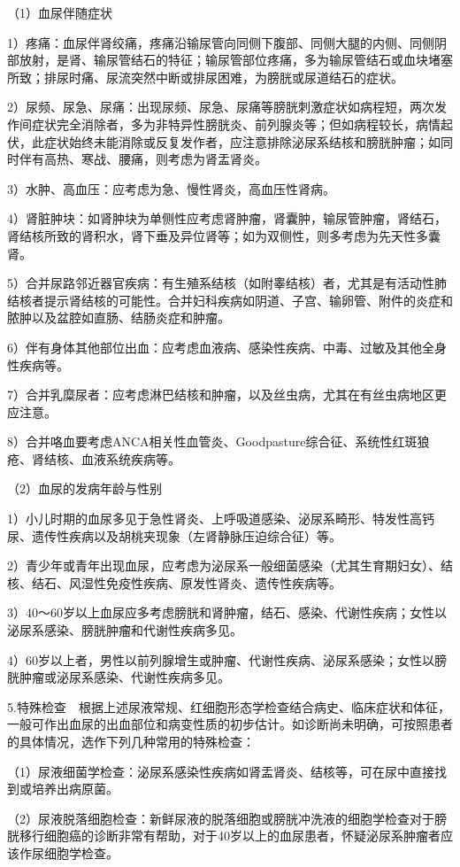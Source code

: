 （1）血尿伴随症状

1）疼痛：血尿伴肾绞痛，疼痛沿输尿管向同侧下腹部、同侧大腿的内侧、同侧阴部放射，是肾、输尿管结石的特征；输尿管部位疼痛，多为输尿管结石或血块堵塞所致；排尿时痛、尿流突然中断或排尿困难，为膀胱或尿道结石的症状。

2）尿频、尿急、尿痛：出现尿频、尿急、尿痛等膀胱刺激症状如病程短，两次发作间症状完全消除者，多为非特异性膀胱炎、前列腺炎等；但如病程较长，病情起伏，此症状始终未能消除或反复发作者，应注意排除泌尿系结核和膀胱肿瘤；如同时伴有高热、寒战、腰痛，则考虑为肾盂肾炎。

3）水肿、高血压：应考虑为急、慢性肾炎，高血压性肾病。

4）肾脏肿块：如肾肿块为单侧性应考虑肾肿瘤，肾囊肿，输尿管肿瘤，肾结石，肾结核所致的肾积水，肾下垂及异位肾等；如为双侧性，则多考虑为先天性多囊肾。

5）合并尿路邻近器官疾病：有生殖系结核（如附睾结核）者，尤其是有活动性肺结核者提示肾结核的可能性。合并妇科疾病如阴道、子宫、输卵管、附件的炎症和脓肿以及盆腔如直肠、结肠炎症和肿瘤。

6）伴有身体其他部位出血：应考虑血液病、感染性疾病、中毒、过敏及其他全身性疾病等。

7）合并乳糜尿者：应考虑淋巴结核和肿瘤，以及丝虫病，尤其在有丝虫病地区更应注意。

8）合并咯血要考虑ANCA相关性血管炎、Goodpasture综合征、系统性红斑狼疮、肾结核、血液系统疾病等。

（2）血尿的发病年龄与性别

1）小儿时期的血尿多见于急性肾炎、上呼吸道感染、泌尿系畸形、特发性高钙尿、遗传性疾病以及胡桃夹现象（左肾静脉压迫综合征）等。

2）青少年或青年出现血尿，应考虑为泌尿系一般细菌感染（尤其生育期妇女）、结核、结石、风湿性免疫性疾病、原发性肾炎、遗传性疾病等。

3）40～60岁以上血尿应多考虑膀胱和肾肿瘤，结石、感染、代谢性疾病；女性以泌尿系感染、膀胱肿瘤和代谢性疾病多见。

4）60岁以上者，男性以前列腺增生或肿瘤、代谢性疾病、泌尿系感染；女性以膀胱肿瘤或泌尿系感染、代谢性疾病多见。

5.特殊检查　根据上述尿液常规、红细胞形态学检查结合病史、临床症状和体征，一般可作出血尿的出血部位和病变性质的初步估计。如诊断尚未明确，可按照患者的具体情况，选作下列几种常用的特殊检查：

（1）尿液细菌学检查：泌尿系感染性疾病如肾盂肾炎、结核等，可在尿中直接找到或培养出病原菌。

（2）尿液脱落细胞检查：新鲜尿液的脱落细胞或膀胱冲洗液的细胞学检查对于膀胱移行细胞癌的诊断非常有帮助，对于40岁以上的血尿患者，怀疑泌尿系肿瘤者应该作尿细胞学检查。

